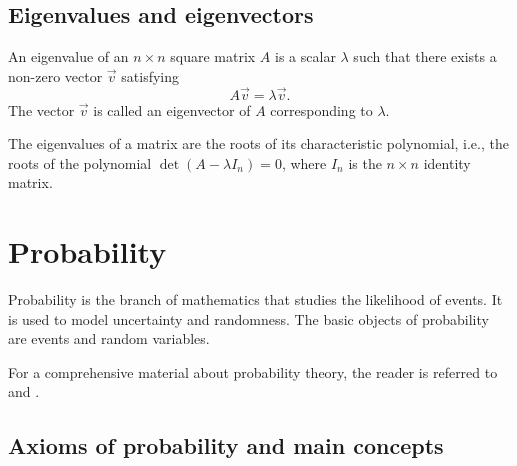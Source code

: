 %

\subsection{Eigenvalues and eigenvectors}

An eigenvalue of an $n \times n$ square matrix $A$ is a scalar $\lambda$ such that there exists a
non-zero vector $\vec{v}$ satisfying
\begin{equation}
  \label{eq:eig}
  A \vec{v} = \lambda \vec{v}\text{.}
\end{equation}
The vector $\vec{v}$ is called an eigenvector of $A$ corresponding to $\lambda$.

The eigenvalues of a matrix are the roots of its characteristic polynomial, i.e., the
roots of the polynomial $\det(A - \lambda I_n) = 0$, where $I_n$ is the $n \times n$ identity matrix.

\section{Probability}

Probability is the branch of mathematics that studies the likelihood of events.  It is
used to model uncertainty and randomness.  The basic objects of probability are events
and random variables.

For a comprehensive material about probability theory, the reader is referred to
\textcite{Ross2019} and \textcite{Ross2023}.

\subsection{Axioms of probability and main concepts}

